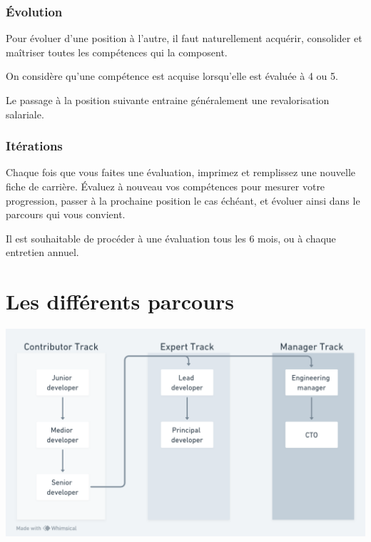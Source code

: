\documentclass[a4paper, french, openany, 12pt]{book}
\begin{document}
\begin{multicols}{2}
  \section*{Évolution}
  
  Pour évoluer d'une position à l'autre, il faut naturellement acquérir, consolider et maîtriser toutes les compétences
  qui la composent.

  On considère qu'une compétence est acquise lorsqu'elle est évaluée à 4 ou 5.

  Le passage à la position suivante entraine généralement une revalorisation salariale.

  \section*{Itérations}

  Chaque fois que vous faites une évaluation, imprimez et remplissez une nouvelle fiche de carrière.
  Évaluez à nouveau vos compétences pour mesurer votre progression, passer à la prochaine position le cas échéant,
  et évoluer ainsi dans le parcours qui vous convient.

  Il est souhaitable de procéder à une évaluation tous les 6 mois, ou à chaque entretien annuel.

\end{multicols}

\part{Les différents parcours}

\includegraphics[width=\textwidth]{images/tracks.png}
\end{document}
